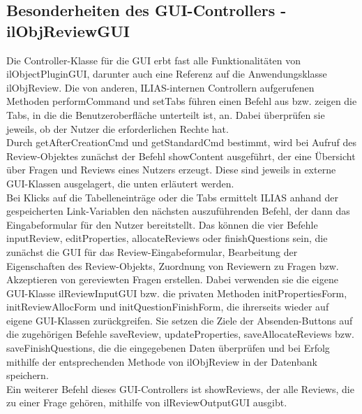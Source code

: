 \documentclass[a4paper]{scrreprt}
\begin{document}
\subsection{Besonderheiten des GUI-Controllers - ilObjReviewGUI}
Die Controller-Klasse für die GUI erbt fast alle Funktionalitäten von ilObjectPluginGUI, darunter auch eine Referenz auf die Anwendungsklasse ilObjReview. Die von anderen, ILIAS-internen Controllern aufgerufenen Methoden performCommand und setTabs führen einen Befehl aus bzw. zeigen die Tabs, in die die Benutzeroberfläche unterteilt ist, an. Dabei überprüfen sie jeweils, ob der Nutzer die erforderlichen Rechte hat.\\
Durch getAfterCreationCmd und getStandardCmd bestimmt, wird bei Aufruf des Review-Objektes zunächst der Befehl showContent ausgeführt, der eine Übersicht über Fragen und Reviews eines Nutzers erzeugt. Diese sind jeweils in externe GUI-Klassen ausgelagert, die unten erläutert werden.\\
Bei Klicks auf die Tabelleneinträge oder die Tabs ermittelt ILIAS anhand der gespeicherten Link-Variablen den nächsten auszuführenden Befehl, der dann das Eingabeformular für den Nutzer bereitstellt. Das können die vier Befehle inputReview, editProperties, allocateReviews oder finishQuestions sein, die zunächst die GUI für das Review-Eingabeformular, Bearbeitung der Eigenschaften des Review-Objekts, Zuordnung von Reviewern zu Fragen bzw. Akzeptieren von gereviewten Fragen erstellen. Dabei verwenden sie die eigene GUI-Klasse ilReviewInputGUI bzw. die privaten Methoden initPropertiesForm, initReviewAllocForm und initQuestionFinishForm, die ihrerseits wieder auf eigene GUI-Klassen zurückgreifen. Sie setzen die Ziele der Absenden-Buttons auf die zugehörigen Befehle saveReview, updateProperties, saveAllocateReviews bzw. saveFinishQuestions, die die eingegebenen Daten überprüfen und bei Erfolg mithilfe der entsprechenden Methode von ilObjReview in der Datenbank speichern.\\
Ein weiterer Befehl dieses GUI-Controllers ist showReviews, der alle Reviews, die zu einer Frage gehören, mithilfe von ilReviewOutputGUI ausgibt.
\end{document}
